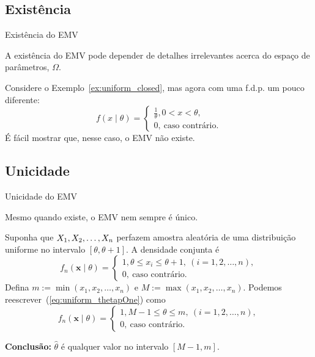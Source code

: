 \subsection*{Existência} 
\begin{frame}{Existência do EMV}
\begin{obs}
\label{rmk:existence_MLE}
A existência do EMV pode depender de detalhes irrelevantes acerca do espaço de parâmetros, $\Omega$. 
\end{obs}
\begin{exemplo}
 Considere o Exemplo~\ref{ex:uniform_closed}, mas agora com uma f.d.p. um pouco diferente:
 \begin{equation}
  \label{eq:uniform_open}
    f(x\mid \theta)=
 \begin{cases}
     \frac{1}{\theta}, 0 < x < \theta,\\
     0,\:\text{caso contrário}.
\end{cases}
 \end{equation} 
É fácil mostrar que, nesse caso, o EMV não existe. 
\end{exemplo}
\end{frame}

\subsection*{Unicidade} 
\begin{frame}{Unicidade do EMV}
\begin{obs}
\label{rmk:unicity_MLE}
Mesmo quando existe, o EMV nem sempre é único. 
\end{obs}

\begin{exemplo}
 Suponha que $X_1, X_2, \ldots, X_n$ perfazem amostra aleatória de uma distribuição uniforme no intervalo $[\theta, \theta + 1]$.
A densidade conjunta é
  \begin{equation}
  \label{eq:uniform_thetapOne}
    f_n(\boldsymbol{x}\mid \theta)=
 \begin{cases}
     1, \theta \leq x_i \leq \theta + 1, \: (i = 1, 2, \ldots, n),\\
     0,\:\text{caso contrário}.
\end{cases}
 \end{equation}
Defina $m := \min(x_1, x_2, \ldots, x_n)$ e $M := \max(x_1, x_2, \ldots, x_n)$.
Podemos reescrever~(\ref{eq:uniform_thetapOne}) como 
  \begin{equation}
  \label{eq:uniform_thetapOne_b}
    f_n(\boldsymbol{x}\mid \theta)=
 \begin{cases}
     1, M - 1 \leq \theta \leq m, \: (i = 1, 2, \ldots, n),\\
     0,\:\text{caso contrário}.
\end{cases}
 \end{equation}
\end{exemplo}
\textbf{Conclusão:} $\hat{\theta}$ é qualquer valor no intervalo $[M-1, m]$.
\end{frame}
 
